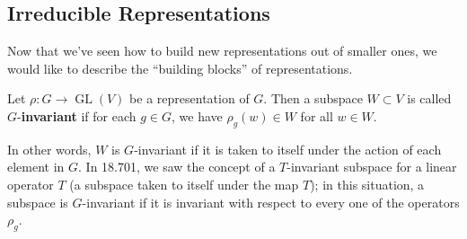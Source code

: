 
\subsection{Irreducible Representations}

Now that we've seen how to build new representations out of smaller ones, we would like to describe the ``building blocks'' of representations. 

\begin{definition}
Let $\rho: G \to \operatorname{GL}(V)$ be a representation of $G$. Then a subspace $W \subset V$ is called $G$-\textbf{invariant} if for each $g \in G$, we have $\rho_g(w) \in W$ for all $w \in W$. 
\end{definition}

In other words, $W$ is $G$-invariant if it is taken to itself under the action of each element in $G$. In 18.701, we saw the concept of a $T$-invariant subspace for a linear operator $T$ (a subspace taken to itself under the map $T$); in this situation, a subspace is $G$-invariant if it is invariant with respect to every one of the operators $\rho_g$. 

